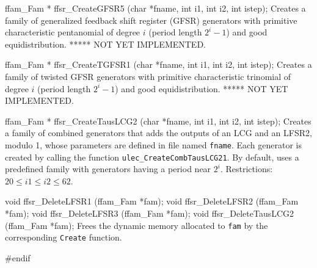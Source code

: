 ffam_Fam * ffsr_CreateGFSR5 (char *fname, int i1, int i2, int istep);
\endcode
\tab
 Creates a family of generalized feedback shift register (GFSR) generators
 with primitive characteristic pentanomial of degree $i$
 (period length $2^i-1$) and good equidistribution.
 ***** NOT YET IMPLEMENTED.
\endtab
\code


ffam_Fam * ffsr_CreateTGFSR1 (char *fname, int i1, int i2, int istep);
\endcode
\tab
 Creates a family of twisted GFSR generators with primitive characteristic
 trinomial of degree $i$
 (period length $2^i-1$) and good equidistribution.
 ***** NOT YET IMPLEMENTED.
\endtab
\code


ffam_Fam * ffsr_CreateTausLCG2 (char *fname, int i1, int i2, int istep);
\endcode
\tab
 Creates a family of combined generators that adds the outputs of an LCG
 and an LFSR2, modulo 1, whose parameters are defined in file named
 {\tt fname}. Each generator is created by calling the function
  {\tt ulec\_CreateCombTausLCG21}. By default, uses a
 predefined family with generators having a period near $2^i$.
 Restrictions: $20 \le i1 \le i2 \le 62$.
\endtab




\code

void ffsr_DeleteLFSR1 (ffam_Fam *fam);
void ffsr_DeleteLFSR2 (ffam_Fam *fam);
void ffsr_DeleteLFSR3 (ffam_Fam *fam);
void ffsr_DeleteTausLCG2 (ffam_Fam *fam);
\endcode
\tab
 Frees the dynamic memory allocated to {\tt fam} by the corresponding
 {\tt Create} function.
\endtab
\code

\hide
#endif
\endhide
\endcode
